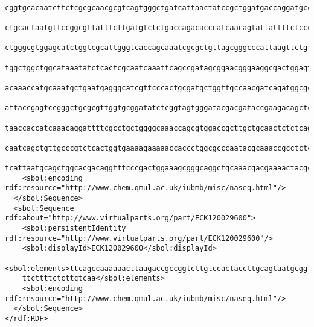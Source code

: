 \begin{lstlisting}
    cggtgcacaatcttctcgcgcaacgcgtcagtgggctgatcattaactatccgctggatgaccaggatgccattgctgtggaagctgc
    ctgcactaatgttccggcgttatttcttgatgtctctgaccagacacccatcaacagtattattttctcccatgaagacggtacgcga
    ctgggcgtggagcatctggtcgcattgggtcaccagcaaatcgcgctgttagcgggcccattaagttctgtctcggcgcgtctgcgtc
    tggctggctggcataaatatctcactcgcaatcaaattcagccgatagcggaacgggaaggcgactggagtgccatgtccggttttca
    acaaaccatgcaaatgctgaatgagggcatcgttcccactgcgatgctggttgccaacgatcagatggcgctgggcgcaatgcgcgcc
    attaccgagtccgggctgcgcgttggtgcggatatctcggtagtgggatacgacgataccgaagacagctcatgttatatcccgccgt
    taaccaccatcaaacaggattttcgcctgctggggcaaaccagcgtggaccgcttgctgcaactctctcagggccaggcggtgaaggg
    caatcagctgttgcccgtctcactggtgaaaagaaaaaccaccctggcgcccaatacgcaaaccgcctctccccgcgcgttggccgat
    tcattaatgcagctggcacgacaggtttcccgactggaaagcgggcaggctgcaaacgacgaaaactacgctttagtagcttaataa</sbol:elements>
    <sbol:encoding rdf:resource="http://www.chem.qmul.ac.uk/iubmb/misc/naseq.html"/>
  </sbol:Sequence>
  <sbol:Sequence rdf:about="http://www.virtualparts.org/part/ECK120029600">
    <sbol:persistentIdentity rdf:resource="http://www.virtualparts.org/part/ECK120029600"/>
    <sbol:displayId>ECK120029600</sbol:displayId>
    <sbol:elements>ttcagccaaaaaacttaagaccgccggtcttgtccactaccttgcagtaatgcggtggacaggatcggcggtt
    ttcttttctcttctcaa</sbol:elements>
    <sbol:encoding rdf:resource="http://www.chem.qmul.ac.uk/iubmb/misc/naseq.html"/>
  </sbol:Sequence>
</rdf:RDF>
\end{lstlisting}